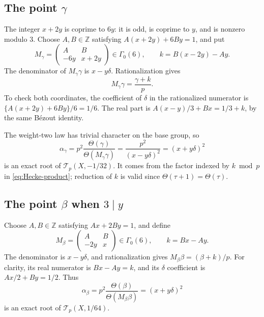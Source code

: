 \documentclass[11pt,a4paper]{article}
\theoremstyle{remark}
\newcommand{\Z}{\mathbb Z}\newcommand{\Q}{\mathbb Q}
\newcommand{\Tp}{\mathcal T_p}
\newcommand{\smat}[4]{\begin{pmatrix}#1&#2\\#3&#4\end{pmatrix}}
\begin{document}
\subsection{The point \texorpdfstring{$\gamma$}{gamma}}
The integer $x+2y$ is coprime to $6y$: it is odd, is coprime to
$y$, and is nonzero modulo $3$.
Choose $A,B\in\Z$ satisfying $A(x+2y)+6By=1$, and put
\begin{equation}\label{eq:M-gamma}
 M_\gamma=\smat AB{-6y}{x+2y}\in\Gamma_0(6),
 \qquad k=B(x-2y)-Ay.
\end{equation}
The denominator of $M_\gamma\gamma$ is $x-y\delta$.
Rationalization gives
\begin{equation}\label{eq:gamma-image}
 M_\gamma\gamma=\frac{\gamma+k}{p}.
\end{equation}
To check both coordinates, the coefficient of $\delta$ in the
rationalized numerator is
$\{A(x+2y)+6By\}/6=1/6$.
The real part is $A(x-y)/3+Bx=1/3+k$, by the same B\'ezout identity.

The weight-two law has trivial character on the base group, so
\begin{equation}\label{eq:root-gamma}
 \alpha_\gamma=p^2\frac{\Theta(\gamma)}{\Theta(M_\gamma\gamma)}
 =\frac{p^2}{(x-y\delta)^2}=(x+y\delta)^2
\end{equation}
is an exact root of $\Tp(X,-1/32)$.
It comes from the factor indexed by $k\bmod p$ in
\eqref{eq:Hecke-product}; reduction of $k$ is valid since
$\Theta(\tau+1)=\Theta(\tau)$.

\subsection{The point \texorpdfstring{$\beta$}{beta} when
\texorpdfstring{$3\mid y$}{3 divides y}}
Choose $A,B\in\Z$ satisfying $Ax+2By=1$, and define
\begin{equation}\label{eq:M-beta-y}
 M_\beta=\smat AB{-2y}x\in\Gamma_0(6),\qquad k=Bx-Ay.
\end{equation}
The denominator is $x-y\delta$, and rationalization gives
$M_\beta\beta=(\beta+k)/p$.
For clarity, its real numerator is $Bx-Ay=k$, and its
$\delta$ coefficient is $Ax/2+By=1/2$.
Thus
\begin{equation}\label{eq:root-beta-y}
 \alpha_\beta=p^2\frac{\Theta(\beta)}{\Theta(M_\beta\beta)}
 =(x+y\delta)^2
\end{equation}
is an exact root of $\Tp(X,1/64)$.
\end{document}
